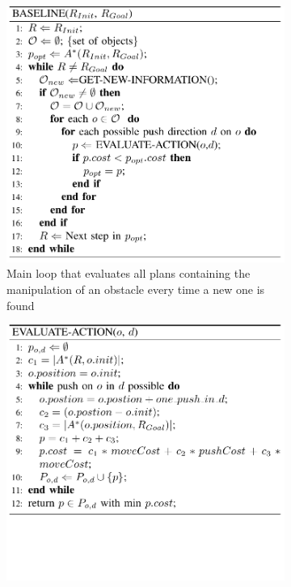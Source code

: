 \begin{figure}[H]
\centering
\begin{subfigure}{.45\textwidth}
  \centering
  \includegraphics[width=\linewidth]{Figures/Wu_Original_Algorithm/algo1.png}
  \caption{Main loop that evaluates all plans containing the manipulation of an obstacle every time a new one is found}
  \label{fig:Wu_Original_Algorithm-algo1}
\end{subfigure}\hspace*{\fill}
\begin{subfigure}{.45\textwidth}
  \centering
  \includegraphics[width=\linewidth]{Figures/Wu_Original_Algorithm/algo2.png}

\end{subfigure}
\end{figure}

